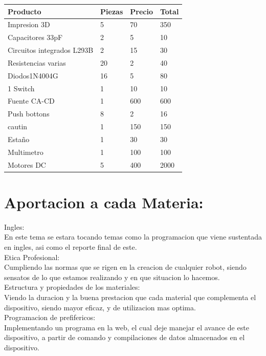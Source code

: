 \documentclass[14pt,a4paper]{article}
\begin{document}
\begin{tabular}{|l|l|l|l|}
\hline
	Producto & Piezas & Precio & Total\\
\hline
	Impresion 3D & 5 & 70 & 350\\

\hline
	Capacitores 33pF & 2 & 5 & 10\\
\hline
	 Circuitos integrados L293B & 2 & 15 & 30\\
\hline
	Resistencias varias & 20 & 2 & 40\\
\hline
	Diodos1N4004G & 16 & 5 & 80\\
\hline
	1 Switch & 1 & 10 & 10\\

\hline
	Fuente CA-CD & 1 & 600 & 600\\
\hline
	Push bottons & 8 & 2 & 16\\
\hline
cautin & 1 & 150 & 150\\
\hline
	Estaño & 1 & 30 & 30\\
\hline
	Multimetro & 1 & 100 & 100\\
\hline
Motores DC & 5 & 400 & 2000\\
\hline
\end{tabular}

\section{Aportacion a cada Materia:}

Ingles:\\
En este tema se estara tocando temas como la programacion que viene sustentada en ingles, asi como el reporte final de este.\\

Etica Profesional:\\
Cumpliendo las normas que se rigen en la creacion de cualquier robot, siendo sensatos de lo que estamos realizando y en que situacion lo hacemos.\\

Estructura y propiedades de los materiales:\\
Viendo la duracion y la buena prestacion que cada material que complementa el dispositivo, siendo mayor eficaz, y de utilizacion mas optima.\\

Programacion de prefifericos:\\
Implementando un programa en la web, el cual deje manejar el avance de este dispositivo, a partir de comando y compilaciones de datos almacenados en el dispositivo.\\
\end{document}
